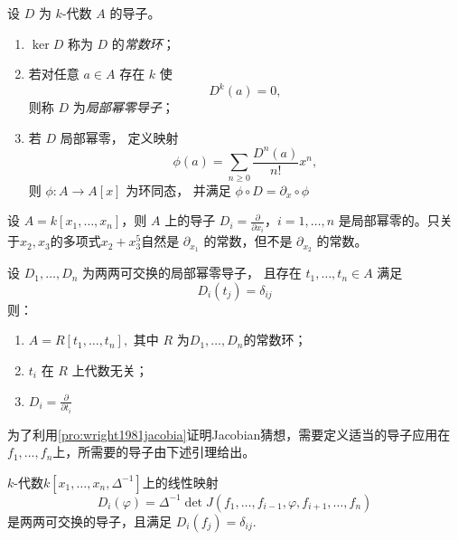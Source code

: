\documentclass[12pt,a4paper]{ctexrep}   %
\begin{document}
\begin{definition}
    设 $D$ 为 $k$-代数 $A$ 的导子。
    \begin{enumerate}
        \item
              $\ker D$ 称为 $D$ 的\emph{常数环}；

        \item
              若对任意 $a\in A$
              存在 $k$ 使
              \[
                  D^k(a)=0,
              \]
              则称 $D$ 为\emph{局部幂零导子}；

        \item
              若 $D$ 局部幂零，
              定义映射
              \[
                  \phi(a)=
                  \sum_{n\ge0}
                  \frac{D^n(a)}{n!}x^n,
              \]
              则 $\phi:A\to A[x]$
              为环同态，
              并满足  $\phi\circ D=\partial_x\circ\phi$
    \end{enumerate}
\end{definition}
\begin{example}
    设 $A=k[x_1,\dots,x_n]$，则 $A$ 上的导子 $D_i=\frac{\partial}{\partial x_i}$，$i=1,\dots,n$ 是局部幂零的。只关于$x_2,x_3$的多项式$x_2+x_3^5$自然是 $\partial_{x_1}$ 的常数，但不是 $\partial_{x_2}$ 的常数。
\end{example}
\begin{proposition}
    \label{pro:wright1981jacobia}
    设
    $D_1,\dots,D_n$
    为两两可交换的局部幂零导子，
    且存在
    $t_1,\dots,t_n\in A$
    满足
    \[
        D_i(t_j)=\delta_{ij}
    \]
    则：

    \begin{enumerate}
        \item  $A=R[t_1,\dots,t_n],$
              其中 $R$ 为$D_1,\dots,D_n$的常数环；

        \item
              $t_i$ 在 $R$ 上代数无关；

        \item
              $ D_i=\frac{\partial}{\partial t_i}$
    \end{enumerate}
\end{proposition}

为了利用\ref{pro:wright1981jacobia}证明Jacobian猜想，需要定义适当的导子应用在$f_1,\dots,f_n$上，所需要的导子由下述引理给出。

\begin{lemma}
    $k$-代数$k[x_1,\dots,x_n,\Delta^{-1}]$上的线性映射
    \begin{equation*}
        D_i(\varphi)
        =
        \Delta^{-1}
        \det
        J(f_1,\dots,f_{i-1},\varphi,f_{i+1},\dots,f_n)
    \end{equation*}
    是两两可交换的导子，且满足 $D_i(f_j)=\delta_{ij}$.
\end{lemma}
\end{document}
